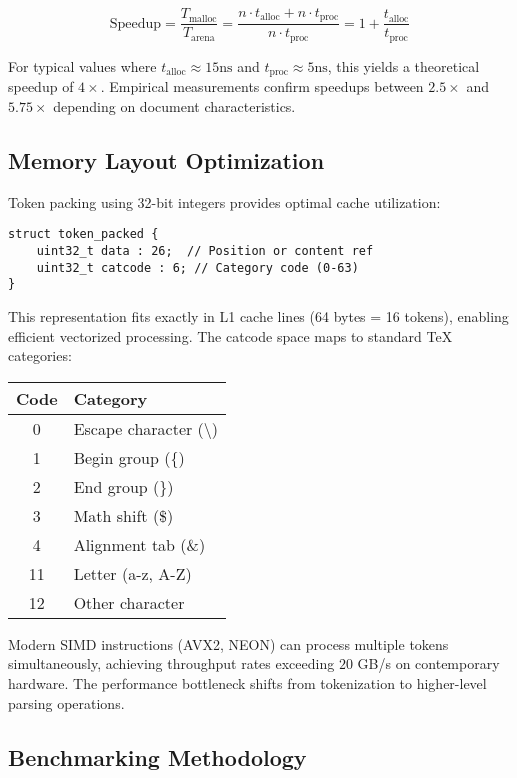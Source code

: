 \documentclass[11pt]{article}
\begin{document}
\begin{equation}
\text{Speedup} = \frac{T_{\text{malloc}}}{T_{\text{arena}}} = \frac{n \cdot t_{\text{alloc}} + n \cdot t_{\text{proc}}}{n \cdot t_{\text{proc}}} = 1 + \frac{t_{\text{alloc}}}{t_{\text{proc}}}
\end{equation}

For typical values where $t_{\text{alloc}} \approx 15\text{ns}$ and $t_{\text{proc}} \approx 5\text{ns}$, this yields a theoretical speedup of $4\times$. Empirical measurements confirm speedups between $2.5\times$ and $5.75\times$ depending on document characteristics.

\subsection{Memory Layout Optimization}

Token packing using 32-bit integers provides optimal cache utilization:

\begin{verbatim}
struct token_packed {
    uint32_t data : 26;  // Position or content ref
    uint32_t catcode : 6; // Category code (0-63)
}
\end{verbatim}

This representation fits exactly in L1 cache lines (64 bytes = 16 tokens), enabling efficient vectorized processing. The catcode space maps to standard TeX categories:

\begin{center}
\begin{tabular}{cl}
\hline
Code & Category \\
\hline
0 & Escape character (\textbackslash) \\
1 & Begin group (\{) \\
2 & End group (\}) \\
3 & Math shift (\$) \\
4 & Alignment tab (\&) \\
11 & Letter (a-z, A-Z) \\
12 & Other character \\
\hline
\end{tabular}
\end{center}

Modern SIMD instructions (AVX2, NEON) can process multiple tokens simultaneously, achieving throughput rates exceeding $20$ GB/s on contemporary hardware. The performance bottleneck shifts from tokenization to higher-level parsing operations.

\subsection{Benchmarking Methodology}
\end{document}
